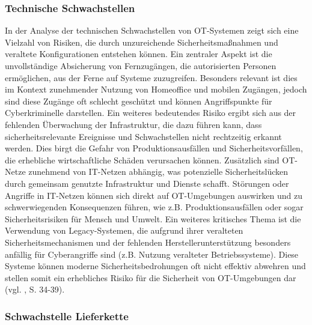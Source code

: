 \subsubsection{Technische Schwachstellen}

In der Analyse der technischen Schwachstellen von OT-Systemen zeigt sich eine Vielzahl von Risiken, die durch unzureichende Sicherheitsmaßnahmen und veraltete Konfigurationen entstehen können. Ein zentraler Aspekt ist die unvollständige Absicherung von Fernzugängen, die autorisierten Personen ermöglichen, aus der Ferne auf Systeme zuzugreifen. Besonders relevant ist dies im Kontext zunehmender Nutzung von Homeoffice und mobilen Zugängen, jedoch sind diese Zugänge oft schlecht geschützt und können Angriffspunkte für Cyberkriminelle darstellen. Ein weiteres bedeutendes Risiko ergibt sich aus der fehlenden Überwachung der Infrastruktur, die dazu führen kann, dass sicherheitsrelevante Ereignisse und Schwachstellen nicht rechtzeitig erkannt werden. Dies birgt die Gefahr von Produktionsausfällen und Sicherheitsvorfällen, die erhebliche wirtschaftliche Schäden verursachen können. Zusätzlich sind OT-Netze zunehmend von IT-Netzen abhängig, was potenzielle Sicherheitslücken durch gemeinsam genutzte Infrastruktur und Dienste schafft. Störungen oder Angriffe in IT-Netzen können sich direkt auf OT-Umgebungen auswirken und zu schwerwiegenden Konsequenzen führen, wie z.B. Produktionsausfällen oder sogar Sicherheitsrisiken für Mensch und Umwelt. Ein weiteres kritisches Thema ist die Verwendung von Legacy-Systemen, die aufgrund ihrer veralteten Sicherheitsmechanismen und der fehlenden Herstellerunterstützung besonders anfällig für Cyberangriffe sind  (z.B. Nutzung veralteter Betriebssysteme). Diese Systeme können moderne Sicherheitsbedrohungen oft nicht effektiv abwehren und stellen somit ein erhebliches Risiko für die Sicherheit von OT-Umgebungen dar (vgl. \cite{ICS}, S. 34-39). 


\subsubsection{Schwachstelle Lieferkette}

